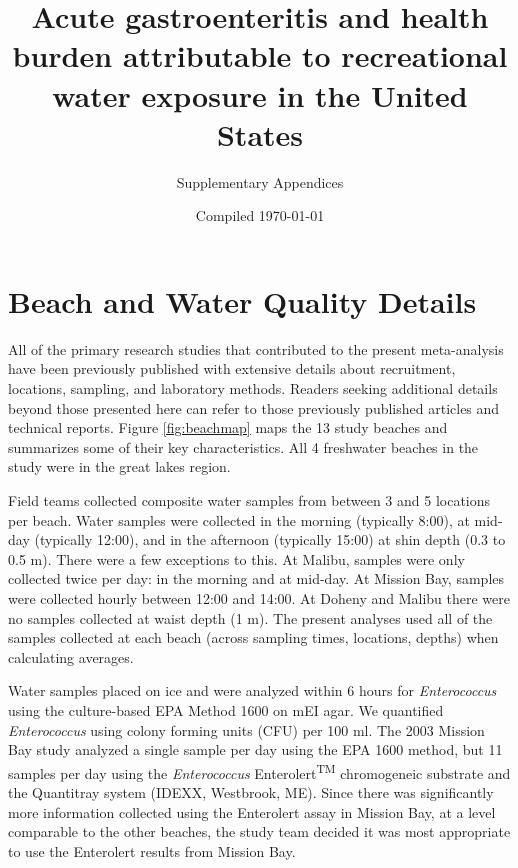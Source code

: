 \documentclass[12pt]{article}\usepackage[]{graphicx}\usepackage[]{color}
\title{Acute gastroenteritis and health burden attributable to recreational water exposure in the United States}
\author{Supplementary Appendices}
\date{Compiled \today }
\begin{document}
\maketitle
\tableofcontents






\clearpage
\section{Beach and Water Quality Details}

All of the primary research studies that contributed to the present meta-analysis have been previously published with extensive details about recruitment, locations, sampling, and laboratory methods. Readers seeking additional details beyond those presented here can refer to those previously published articles and technical reports.\supercite{Colford2005-nb, Colford2007-mc,Wade2006-pp,Wade2008-xj,Wade2010-bb,Wade2010-ps,Colford2012-um,Arnold2013-xd,Yau2014-pl} Figure \ref{fig:beachmap} maps the 13 study beaches and summarizes some of their key characteristics. All 4 freshwater beaches in the study were in the great lakes region. 

Field teams collected composite water samples from between 3 and 5 locations per beach. Water samples were collected in the morning (typically 8:00), at mid-day (typically 12:00), and in the afternoon (typically 15:00) at shin depth (0.3 to 0.5 m).  There were a few exceptions to this. At Malibu, samples were only collected twice per day: in the morning and at mid-day. At Mission Bay, samples were collected hourly between 12:00 and 14:00. At Doheny and Malibu there were no samples collected at waist depth (1 m).  The present analyses used all of the samples collected at each beach (across sampling times, locations, depths) when calculating averages.

Water samples placed on ice and were analyzed within 6 hours for \textit{Enterococcus} using the culture-based EPA Method 1600\supercite{Epa2009-dm} on mEI agar.  We quantified \textit{Enterococcus} using colony forming units (CFU) per 100 ml.  The 2003 Mission Bay study analyzed a single sample per day using the EPA 1600 method, but 11 samples per day using the \textit{Enterococcus} Enterolert\textsuperscript{TM} chromogeneic substrate and the Quantitray system (IDEXX, Westbrook, ME). Since there was significantly more information collected using the Enterolert assay in Mission Bay, at a level comparable to the other beaches, the study team decided it was most appropriate to use the Enterolert results from Mission Bay.
\end{document}
